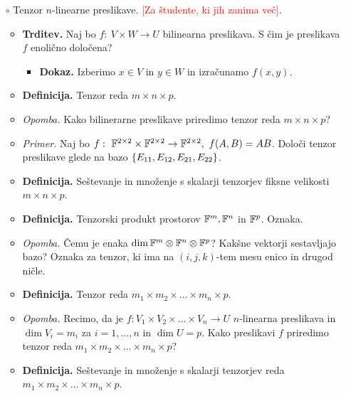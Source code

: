 \begin{enumerate}
\begin{itemize}
\begin{itemize}
            (3) Z indukcijo na število transpozicij v razcepu. Z pomočjo permutacije $\rho = \tau_1 \circ \pi$.
        \end{itemize}
    \end{itemize}
    \item[$\circ$] Tenzor $n$-linearne preslikave. \textcolor{red}{[Za študente, ki jih zanima več]}.
    \begin{itemize}
        \item \colorbox{blue!30}{\textbf{Trditev.}} Naj bo $f: \ V \times W \to U$ bilinearna preslikava. S čim je preslikava $f$ enolično določena?
        \begin{itemize}
            \item \colorbox{green!30}{\textbf{Dokaz.}} Izberimo $x \in V$ in $y \in W$ in izračunamo $f(x, y)$.
        \end{itemize}
        \item \colorbox{purple!30}{\textbf{Definicija.}} Tenzor reda $m \times n \times p$.
        \item \colorbox{yellow!30}{\emph{Opomba.}}  Kako bilinerarne preslikave priredimo tenzor reda $m \times n \times p$?
        \item \colorbox{yellow!30}{\emph{Primer.}} Naj bo $f: \ \mathbb{F}^{2 \times 2} \times \mathbb{F}^{2 \times 2} \to \mathbb{F}^{2 \times 2}, \ f(A,B) = AB$.         
        Določi tenzor preslikave glede na bazo $\left\{E_{11}, E_{12}, E_{21}, E_{22}\right\}$.
        \item \colorbox{purple!30}{\textbf{Definicija.}} Seštevanje in množenje s skalarji tenzorjev fiksne velikosti $m \times n \times p$.
        \item \colorbox{purple!30}{\textbf{Definicija.}} Tenzorski produkt prostorov $\mathbb{F}^m, \mathbb{F}^n$ in $\mathbb{F}^p$. Oznaka.
        \item \colorbox{yellow!30}{\emph{Opomba.}} Čemu je enaka $\dim \mathbb{F}^m \otimes \mathbb{F}^n \otimes \mathbb{F}^p$? Kakšne vektorji sestavljajo bazo? Oznaka za tenzor, ki ima na $(i, j, k)$-tem mesu enico in drugod ničle.
        \item \colorbox{purple!30}{\textbf{Definicija.}} Tenzor reda $m_1 \times m_2 \times \ldots \times m_n \times p$.
        \item \colorbox{yellow!30}{\emph{Opomba.}} Recimo, da je $f: V_1 \times V_2 \times \ldots \times V_n \to U$ $n$-linearna preslikava in $\dim V_i = m_i$ za $i = 1, \ldots, n$ in $\dim U = p$. Kako preslikavi $f$ priredimo tenzor reda $m_1 \times m_2 \times \ldots \times m_n \times p$?
        \item \colorbox{purple!30}{\textbf{Definicija.}} Seštevanje in množenje s skalarji tenzorjev reda $m_1 \times m_2 \times \ldots \times m_n \times p$.

\end{itemize}
\end{enumerate}
